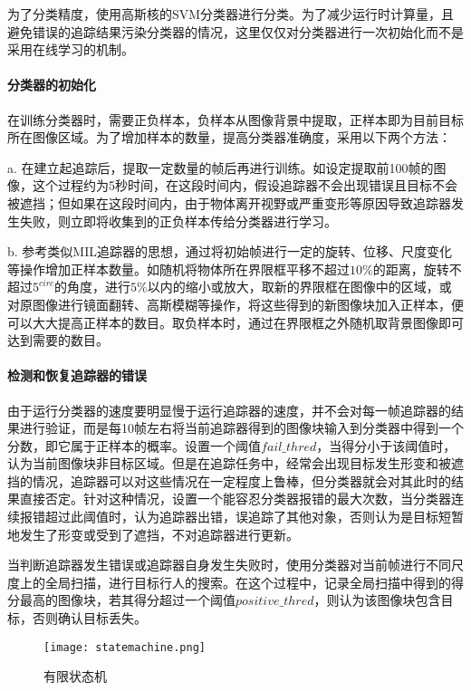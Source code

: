   为了分类精度，使用高斯核的SVM分类器进行分类。为了减少运行时计算量，且避免错误的追踪结果污染分类器的情况，这里仅仅对分类器进行一次初始化而不是采用在线学习的机制。

\paragraph{分类器的初始化}

  在训练分类器时，需要正负样本，负样本从图像背景中提取，正样本即为目前目标所在图像区域。为了增加样本的数量，提高分类器准确度，采用以下两个方法：
  
  a. 在建立起追踪后，提取一定数量的帧后再进行训练。如设定提取前100帧的图像，这个过程约为5秒时间，在这段时间内，假设追踪器不会出现错误且目标不会被遮挡；但如果在这段时间内，由于物体离开视野或严重变形等原因导致追踪器发生失败，则立即将收集到的正负样本传给分类器进行学习。

  b. 参考类似MIL追踪器的思想，通过将初始帧进行一定的旋转、位移、尺度变化等操作增加正样本数量。如随机将物体所在界限框平移不超过$10\%$的距离，旋转不超过$5^{circ}$的角度，进行$5\%$以内的缩小或放大，取新的界限框在图像中的区域，或对原图像进行镜面翻转、高斯模糊等操作，将这些得到的新图像块加入正样本，便可以大大提高正样本的数目。取负样本时，通过在界限框之外随机取背景图像即可达到需要的数目。

\paragraph{检测和恢复追踪器的错误}
  由于运行分类器的速度要明显慢于运行追踪器的速度，并不会对每一帧追踪器的结果进行验证，而是每10帧左右将当前追踪器得到的图像块输入到分类器中得到一个分数，即它属于正样本的概率。设置一个阈值$fail\_thred$，当得分小于该阈值时，认为当前图像块非目标区域。但是在追踪任务中，经常会出现目标发生形变和被遮挡的情况，追踪器可以对这些情况在一定程度上鲁棒，但分类器就会对其此时的结果直接否定。针对这种情况，设置一个能容忍分类器报错的最大次数，当分类器连续报错超过此阈值时，认为追踪器出错，误追踪了其他对象，否则认为是目标短暂地发生了形变或受到了遮挡，不对追踪器进行更新。

  当判断追踪器发生错误或追踪器自身发生失败时，使用分类器对当前帧进行不同尺度上的全局扫描，进行目标行人的搜索。在这个过程中，记录全局扫描中得到的得分最高的图像块，若其得分超过一个阈值$positive\_thred$，则认为该图像块包含目标，否则确认目标丢失。


\begin{figure}[htb]
  \centering
  \texttt{[image: statemachine.png]}
  \caption{有限状态机}
  \label{fig:statemachine}
\end{figure}

